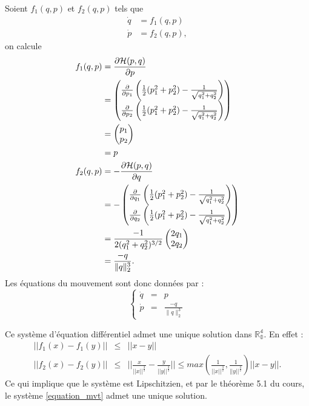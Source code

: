 Soient $f_1(q,p)$ et $f_2(q,p)$ tels que
\begin{align*}
  \dot{q} & = f_1(q,p)\\
  \dot{p} & = f_2(q,p),
\end{align*}
on calcule
\begin{align*}
  f_1(q,p) & =  \fpart{\Ha (p,q)}{p}\\
  & =
  \begin{pmatrix}
    \fpart{}{p_1} \left(\frac{1}{2}(p_1^2 + p_2^2) - \frac{1}{\sqrt{q_1^2 + q_2^2}}\right)\\
    \fpart{}{p_2} \left(\frac{1}{2}(p_1^2 + p_2^2) - \frac{1}{\sqrt{q_1^2 + q_2^2}}\right)
  \end{pmatrix}\\
  & =
  \begin{pmatrix}
    p_1\\
    p_2
  \end{pmatrix}\\
  & = p\\
%
  f_2(q,p) & =  -\fpart{\Ha (p,q)}{q}\\
  & =
  -\begin{pmatrix}
    \fpart{}{q_1} \left(\frac{1}{2}(p_1^2 + p_2^2) - \frac{1}{\sqrt{q_1^2 + q_2^2}}\right)\\
    \fpart{}{q_2} \left(\frac{1}{2}(p_1^2 + p_2^2) - \frac{1}{\sqrt{q_1^2 + q_2^2}}\right)
  \end{pmatrix}\\
  & =
  \frac{-1}{2(q_1^2 + q_2^2)^{3/2}}
  \begin{pmatrix}
    2q_1\\
    2q_2
  \end{pmatrix}\\
  & = \frac{-q}{\|q\|_2^3}.
\end{align*}
Les équations du mouvement sont donc données par : 
\begin{equation} \label{equation_mvt}
\left\lbrace
\begin{array}{ccc} 
\dot{q} &=& p\\
\dot{p} &=&  \frac{-q}{\|q\|_2^3}
\end{array}
\right.
\end{equation}

Ce système d'équation différentiel admet une unique solution dans $\mathbb{R^4_0}$. En effet : 
\begin{eqnarray}
||f_1(x)-f_1(y)|| &\leq & ||x-y|| \\
||f_2(x) - f_2(y)|| &\leq & ||\frac{x}{||x||^{\frac{3}{2}}} - \frac{y}{||y||^{\frac{3}{2}}}|| \leq max(\frac{1}{||x||^{\frac{3}{2}}}, \frac{1}{||y||^{\frac{3}{2}}}) ||x-y||.
\end{eqnarray}
Ce qui implique que le système est Lipschitzien, et par le théorème 5.1 du cours, le système \ref{equation_mvt} admet une unique solution.


